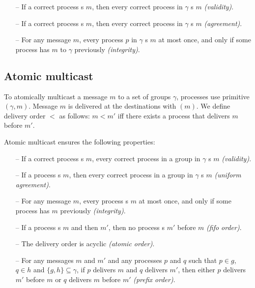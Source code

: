 \begin{itemize}

    \item[--] If a correct process \rmcast{}s $m$, then every correct
      process in $\gamma$ \rmdel{}s $m$ \emph{(validity)}.
    
    \item[--] If a correct process \rmdel{}s $m$, then every correct
      process in $\gamma$ \rmdel{}s $m$ \emph{(agreement)}.
    
    \item[--] For any message $m$, every process $p$ in $\gamma$
      \rmdel{}s $m$ at most once, and only if some process has
      \rmcast{} $m$ to $\gamma$ previously \emph{(integrity)}.
    
\end{itemize}

\subsection{Atomic multicast}
\label{sec:amcast}

To atomically multicast a message $m$ to a set of groups $\gamma$,
processes use primitive \amcast$(\gamma, m)$.  Message $m$ is
delivered at the destinations with \amdel$(m)$.  We define delivery
order $<$ as follows: $m < m'$ iff there exists a process that
delivers $m$ before $m'$.

Atomic multicast ensures the following properties:

\begin{itemize}
    
    \item[--] If a correct process \amcast{}s $m$, every correct
      process in a group in $\gamma$ \amdel{}s $m$ \emph{(validity)}.
    
    \item[--] If a process \amdel{}s $m$, then every correct process
      in a group in $\gamma$ \amdel{}s $m$ \emph{(uniform agreement)}.
    
    \item[--] For any message $m$, every process \amdel{}s $m$ at most
      once, and only if some process has \amcast{} $m$ previously
      \emph{(integrity)}.
    
    \item[--] If a process \amcast{}s $m$ and then $m'$, then no process \amdel{}s $m'$ before $m$ \emph{(fifo order)}.

    \item[--] The delivery order is acyclic \emph{(atomic order)}.

    \item[--] For any messages $m$ and $m'$ and any processes $p$ and
      $q$ such that $p \in g$, $q \in h$ and $\{ g, h \} \subseteq
      \gamma$, if $p$ delivers $m$ and $q$ delivers $m'$, then either
      $p$ delivers $m'$ before $m$ or $q$ delivers $m$ before $m'$
      \emph{(prefix order)}.
    
\end{itemize}

